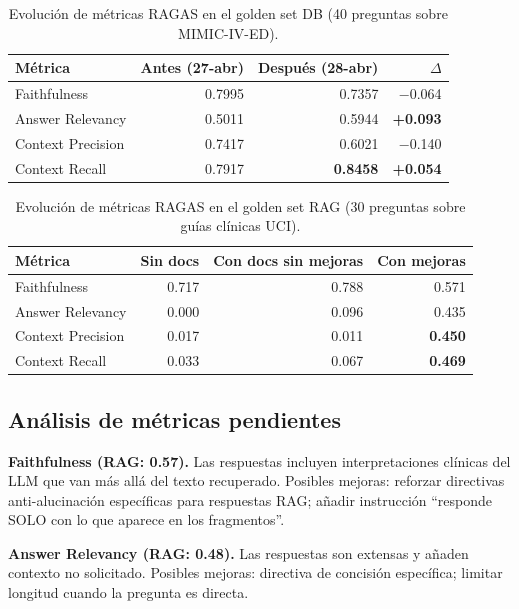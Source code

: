 \begin{table}[H]
\centering
\caption{Evolución de métricas \acs{RAGAS} en el golden set DB (40 preguntas sobre \acs{MIMIC}-IV-\acs{ED}).}
\label{tab:appendix_ragas_db}
\footnotesize
\begin{tabularx}{\columnwidth}{lrrr}
\toprule
\textbf{Métrica} & \textbf{Antes (27-abr)} & \textbf{Después (28-abr)} & \textbf{$\Delta$} \\
\midrule
Faithfulness & 0.7995 & 0.7357 & $-$0.064 \\
Answer Relevancy & 0.5011 & 0.5944 & \textbf{+0.093} \\
Context Precision & 0.7417 & 0.6021 & $-$0.140 \\
Context Recall & 0.7917 & \textbf{0.8458} & \textbf{+0.054} \\
\bottomrule
\end{tabularx}
\end{table}

\begin{table}[H]
\centering
\caption{Evolución de métricas \acs{RAGAS} en el golden set \acs{RAG} (30 preguntas sobre guías clínicas \acs{UCI}).}
\label{tab:appendix_ragas_rag}
\footnotesize
\begin{tabularx}{\columnwidth}{lrrr}
\toprule
\textbf{Métrica} & \textbf{Sin docs} & \textbf{Con docs sin mejoras} & \textbf{Con mejoras} \\
\midrule
Faithfulness & 0.717 & 0.788 & 0.571 \\
Answer Relevancy & 0.000 & 0.096 & 0.435 \\
Context Precision & 0.017 & 0.011 & \textbf{0.450} \\
Context Recall & 0.033 & 0.067 & \textbf{0.469} \\
\bottomrule
\end{tabularx}
\end{table}

\subsection{Análisis de métricas pendientes}

\textbf{Faithfulness (\ac{RAG}: 0.57).} Las respuestas incluyen interpretaciones clínicas del \ac{LLM} que van más allá del texto recuperado. Posibles mejoras: reforzar directivas anti-alucinación específicas para respuestas \ac{RAG}; añadir instrucción ``responde SOLO con lo que aparece en los fragmentos''.

\textbf{Answer Relevancy (\ac{RAG}: 0.48).} Las respuestas son extensas y añaden contexto no solicitado. Posibles mejoras: directiva de concisión específica; limitar longitud cuando la pregunta es directa.

